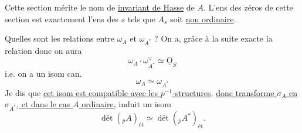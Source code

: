 Cette section mérite le nom de \uline{invariant de Hasse} de $A$. L'ens des zéros de cette section est exactement l'ens des $s$ tels que $A_s$ soit \uline{non ordinaire}.

Quelles sont les relations entre $\omega_A$ et $\omega_{A^*}$ ? On a, grâce à la suite exacte
la relation
donc on aura
\[
\omega_A\cdot\omega_{A^*}^\vee\simeq\underline{\mathrm O}_S
\]
i.e. on a un isom can.
\[
\omega_A\simeq\omega_{A^*}
\]
Je dis que \uline{cet isom est compatible avec les $p^{-1}$-structures}, \uline{donc transforme $\sigma_A$ en $\sigma_{A^*}$, et dans le cas $A$ ordinaire}, induit un isom
\[
\operatorname{dét}({}_pA)_{\text{ét}}\simeq\operatorname{dét}({}_pA^*)_{\text{ét}}.
\]
